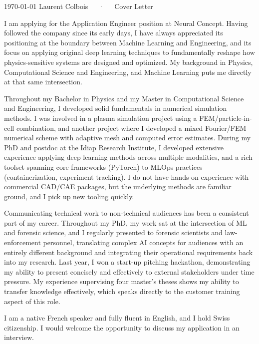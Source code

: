 \documentclass[11pt, a4paper]{awesome-cv}
\begin{document}
\makecvheader[C]

\makecvfooter
  {\today}
  {Laurent Colbois~~~·~~~Cover Letter}
  {}

\makelettertitle

\begin{cvletter}

I am applying for the Application Engineer position at Neural Concept. Having followed the company since its early days, I have always appreciated its positioning at the boundary between Machine Learning and Engineering, and its focus on applying original deep learning techniques to fundamentally reshape how physics-sensitive systems are designed and optimized.
My background in Physics, Computational Science and Engineering, and Machine Learning puts me directly at that same intersection.

Throughout my Bachelor in Physics and my Master in Computational Science and Engineering, I developed solid fundamentals in numerical simulation methods. I was involved in a plasma simulation project using a FEM/particle-in-cell combination, and another project where I developed a mixed Fourier/FEM numerical scheme with adaptive mesh and computed error estimates. During my PhD and postdoc at the Idiap Research Institute, I developed extensive experience applying deep learning methods across multiple modalities, and a rich toolset spanning core frameworks (PyTorch) to MLOps practices (containerization, experiment tracking). I do not have hands-on experience with commercial CAD/CAE packages, but the underlying methods are familiar ground, and I pick up new tooling quickly.

Communicating technical work to non-technical audiences has been a consistent part of my career. Throughout my PhD, my work sat at the intersection of ML and forensic science, and I regularly presented to forensic scientists and law-enforcement personnel, translating complex AI concepts for audiences with an entirely different background and integrating their operational requirements back into my research. Last year, I won a start-up pitching hackathon, demonstrating my ability to present concisely and effectively to external stakeholders under time pressure. My experience supervising four master's theses shows my ability to transfer knowledge effectively, which speaks directly to the customer training aspect of this role.

I am a native French speaker and fully fluent in English, and I hold Swiss citizenship. I would welcome the opportunity to discuss my application in an interview.


\end{cvletter}


\makeletterclosing
\end{document}
